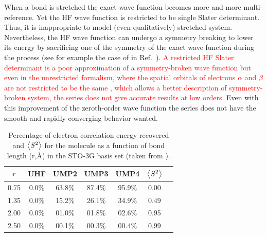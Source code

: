 \documentclass[11pt,a4paper]{article}
\newcommand{\titou}[1]{\textcolor{red}{#1}}
\begin{document}
When a bond is stretched the exact wave function becomes more and more multi-reference. Yet the HF wave function is restricted to be single Slater determinant.
Thus, it is inappropriate to model (even qualitatively) stretched system. Nevertheless, the HF wave function can undergo a symmetry breaking to lower its energy by sacrificing one of the symmetry of the exact wave function during the process (see for example the case of  in Ref.~\cite{SzaboBook}). 
\titou{A restricted HF Slater determinant is a poor approximation of a symmetry-broken wave function but even in the unrestricted formalism, where the spatial orbitals of electrons $\alpha$ and $\beta$ are not restricted to be the same \cite{Fukutome_1981}, which allows a better description of symmetry-broken system, the series does not give accurate results at low orders.} Even with this improvement of the zeroth-order wave function the series does not have the smooth and rapidly converging behavior wanted. 

\begin{table}[h!]
    \centering
    \caption{\centering Percentage of electron correlation energy recovered and $\expval{S^2}$ for the  molecule as a function of bond length (r,\si{\angstrom}) in the STO-3G basis set (taken from \cite{Gill_1988}).}
    \begin{tabular}{ccccccc}
\hline
\hline
 $r$ & UHF & UMP2 & UMP3 & UMP4 & $\expval{S^2}$ \\
\hline
0.75 & 0.0\% & 63.8\% & 87.4\% & 95.9\% & 0.00\\
1.35 & 0.0\% & 15.2\% & 26.1\% & 34.9\% & 0.49\\
2.00 & 0.0\% & 01.0\% & 01.8\% & 02.6\% & 0.95\\
2.50 & 0.0\% & 00.1\% & 00.3\% & 00.4\% & 0.99\\
\hline
\hline
\end{tabular}
    \label{tab:SpinContamination}
\end{table}
\end{document}
